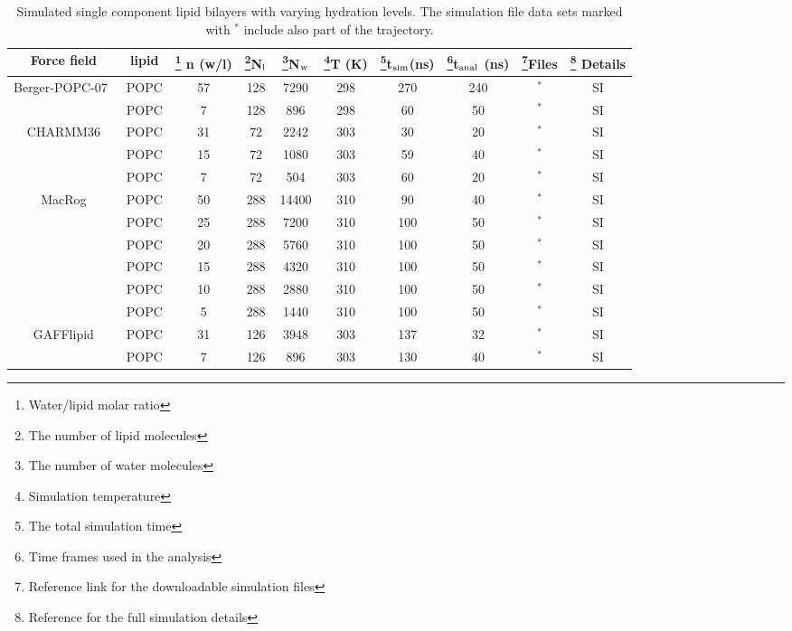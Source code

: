 \documentclass[pre,aps,floatfix,authordate1-4,twocolumn]{revtex4-1}
\begin{document}
\begin{table*}[htb]
\centering
\caption{Simulated single component lipid bilayers with varying hydration levels. The simulation file data sets marked with $^*$ include also part of the trajectory.
}\label{systemsDEHYD}
\begin{tabular}{c c c c c c c c c c}
Force field & lipid & \footnote{Water/lipid molar ratio} n (w/l)   & \footnote{The number of lipid molecules}N$_{\rm l}$   &  \footnote{The number of water molecules}N$_{\rm w}$ & \footnote{Simulation temperature}T (K)  & \footnote{The total simulation time}t$_{{\rm sim}}$(ns)  & \footnote{Time frames used in the analysis}t$_{{\rm anal}}$ (ns)& \footnote{Reference link for the downloadable simulation files}Files  &  \footnote{Reference for the full simulation details} Details\\
\hline
Berger-POPC-07~\cite{ollila07a}          &   POPC & 57  &128 & 7290  & 298  & 270 & 240 & \cite{bergerFILESpopc}$^*$ & SI \\
                                        &   POPC & 7  &128 & 896   & 298  & 60 & 50 & \cite{bergerDEHYDfiles}$^*$ & SI \\
CHARMM36\cite{klauda10}              & POPC   & 31 & 72  &  2242 & 303 & 30 & 20 & \cite{charmm36filesSHORT}$^*$ & SI \\
                               & POPC   & 15 & 72 &  1080  & 303 & 59 & 40 & \cite{charmm36files15wPERl}$^*$ & SI \\
                            & POPC   & 7  & 72  &  504  & 303 & 60 & 20 & \cite{charmm36files7wPERl}$^*$ & SI \\
MacRog\cite{maciejewski14}     & POPC   & 50 & 288  & 14400 & 310 & 90 & 40 & \cite{macrogdehydFILES}$^*$ & SI \\
                               & POPC   & 25 & 288  & 7200 & 310 & 100 & 50 & \cite{macrogdehydFILES}$^*$ & SI \\
                                & POPC   & 20 & 288  & 5760 & 310 & 100 & 50 & \cite{macrogdehydFILES}$^*$ & SI \\
                                & POPC   & 15 & 288  & 4320 & 310 & 100 & 50 & \cite{macrogdehydFILES}$^*$ & SI \\
                                & POPC   & 10 & 288  & 2880 & 310 & 100 & 50 & \cite{macrogdehydFILES}$^*$ & SI \\
                                & POPC   & 5 & 288   & 1440 & 310 & 100 & 50 & \cite{macrogdehydFILES}$^*$ & SI \\
GAFFlipid\cite{dickson12}      & POPC   & 31& 126  & 3948  & 303 & 137 & 32 & \cite{GAFFlipidFILES}$^*$ & SI  \\
                               & POPC   & 7& 126  & 896   & 303 & 130 & 40 & \cite{gaffDEHYDfiles}$^*$ & SI \\
\end{tabular}
\end{table*} 
\end{document}
